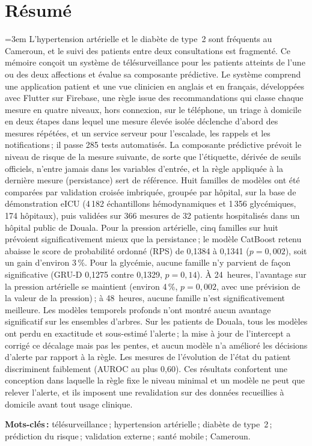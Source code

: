 \chapter*{Résumé}
{\emergencystretch=3em
L'hypertension artérielle et le diabète de type~2 sont fréquents au Cameroun, et le suivi des patients entre deux consultations est fragmenté. Ce mémoire conçoit un système de télésurveillance pour les patients atteints de l'une ou des deux affections et évalue sa composante prédictive. Le système comprend une application patient et une vue clinicien en anglais et en français, développées avec Flutter sur Firebase, une règle issue des recommandations qui classe chaque mesure en quatre niveaux, hors connexion, sur le téléphone, un triage à domicile en deux étapes dans lequel une mesure élevée isolée déclenche d'abord des mesures répétées, et un service serveur pour l'escalade, les rappels et les notifications\,; il passe 285 tests automatisés. La composante prédictive prévoit le niveau de risque de la mesure suivante, de sorte que l'étiquette, dérivée de seuils officiels, n'entre jamais dans les variables d'entrée, et la règle appliquée à la dernière mesure (persistance) sert de référence. Huit familles de modèles ont été comparées par validation croisée imbriquée, groupée par hôpital, sur la base de démonstration eICU (4\,182 échantillons hémodynamiques et 1\,356 glycémiques, 174 hôpitaux), puis validées sur 366 mesures de 32 patients hospitalisés dans un hôpital public de Douala. Pour la pression artérielle, cinq familles sur huit prévoient significativement mieux que la persistance\,; le modèle CatBoost retenu abaisse le score de probabilité ordonné (RPS) de 0,1384 à 0,1341 ($p = 0{,}002$), soit un gain d'environ 3\,\%. Pour la glycémie, aucune famille n'y parvient de façon significative (GRU-D 0,1275 contre 0,1329, $p = 0{,}14$). À 24~heures, l'avantage sur la pression artérielle se maintient (environ 4\,\%, $p = 0{,}002$, avec une prévision de la valeur de la pression)\,; à 48~heures, aucune famille n'est significativement meilleure. Les modèles temporels profonds n'ont montré aucun avantage significatif sur les ensembles d'arbres. Sur les patients de Douala, tous les modèles ont perdu en exactitude et sous-estimé l'alerte\,; la mise à jour de l'intercept a corrigé ce décalage mais pas les pentes, et aucun modèle n'a amélioré les décisions d'alerte par rapport à la règle. Les mesures de l'évolution de l'état du patient discriminent faiblement (AUROC au plus 0,60). Ces résultats confortent une conception dans laquelle la règle fixe le niveau minimal et un modèle ne peut que relever l'alerte, et ils imposent une revalidation sur des données recueillies à domicile avant tout usage clinique.

\medskip
\noindent\textbf{Mots-clés\,:} télésurveillance\,; hypertension artérielle\,; diabète de type~2\,; prédiction du risque\,; validation externe\,; santé mobile\,; Cameroun.\par}

